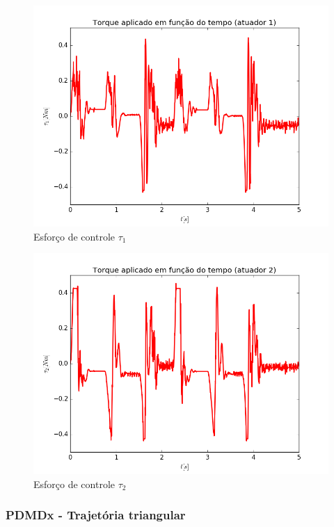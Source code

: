 \documentclass[]{politex}
\begin{document}
\begin{multicols}{2}
\begin{figure}[H]
	\centering
	\includegraphics[scale=0.39]{../../../Experimental/Aquisicoes/PIDx_triangulo/tau1.png}  
	\caption{Esforço de controle $\tau_1$}
	\label{fig:PIDx_triangulo_tau1}
\end{figure}
\begin{figure}[H]
	\centering
	\includegraphics[scale=0.39]{../../../Experimental/Aquisicoes/PIDx_triangulo/tau2.png}  
	\caption{Esforço de controle $\tau_2$}
	\label{fig:PIDx_triangulo_tau2}
\end{figure}
\end{multicols}

\subsubsection{PDMDx - Trajetória triangular}
\end{document}

